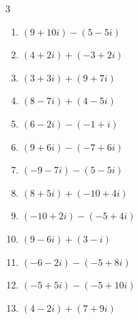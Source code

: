 \begin{multicols}{3}
\begin{enumerate}
        \phantom{$\displaystyle =i$}

  \item $\displaystyle (9+10i) - (5-5i)$

        \phantom{$\displaystyle =4+15i$}

  \item $\displaystyle (4+2i) + (-3+2i)$

        \phantom{$\displaystyle =1+4i$}

  \item $\displaystyle (3+3i) + (9+7i)$

        \phantom{$\displaystyle =12+10i$}

  \item $\displaystyle (8-7i) + (4-5i)$

        \phantom{$\displaystyle =12-12i$}

  \item $\displaystyle (6-2i) - (-1+i)$

        \phantom{$\displaystyle =7-3i$}

  \item $\displaystyle (9+6i) - (-7+6i)$

        \phantom{$\displaystyle =16$}

  \item $\displaystyle (-9-7i) - (5-5i)$

        \phantom{$\displaystyle =-14-2i$}

  \item $\displaystyle (8+5i) + (-10+4i)$

        \phantom{$\displaystyle =-2+9i$}

  \item $\displaystyle (-10+2i) - (-5+4i)$

        \phantom{$\displaystyle =-5-2i$}

  \item $\displaystyle (9-6i) + (3-i)$

        \phantom{$\displaystyle =12-7i$}

  \item $\displaystyle (-6-2i) - (-5+8i)$

        \phantom{$\displaystyle =-1-10i$}

  \item $\displaystyle (-5+5i) - (-5+10i)$

        \phantom{$\displaystyle =-5i$}

  \item $\displaystyle (4-2i) + (7+9i)$


\end{enumerate}
\end{multicols}
